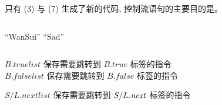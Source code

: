 \begin{frame}{}
  \begin{center}
  \end{center}
\end{frame}

\begin{frame}{}

  \begin{center}
    只有 (3) 与 (7) 生成了新的代码, 控制流语句的主要目的是。
  \end{center}
\end{frame}

\begin{frame}[fragile]{}
  \begin{columns}
      \begin{algorithm}[H]
        \begin{algorithmic}[1]
                \State {} ``WanSui''
              \EndWhile
            \Else
              \State {} ``Sad''
            \EndIf
          \EndProcedure
        \end{algorithmic}
      \end{algorithm}
  \end{columns}
\end{frame}

\begin{frame}{}
  \pause
  \pause
\end{frame}

\begin{frame}{}
  \begin{center}
    {$B.\mathit{truelist}$ 保存{需要跳转到 $B.\mathit{true}$ 标签}的{指令}} \\[5pt]
    {$B.\mathit{falselist}$ 保存{需要跳转到 $B.\mathit{false}$ 标签}的{指令}}


    {$S/L.\mathit{nextlist}$} 保存{需要跳转到 $S/L.\mathit{next}$ 标签的指令}
  \end{center}
\end{frame}

